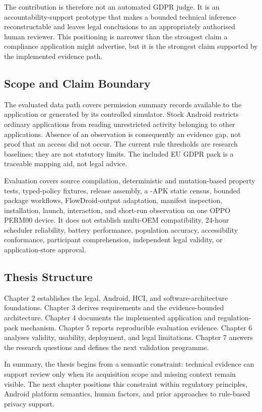 The contribution is therefore not an automated GDPR judge. It is an accountability-support prototype that makes a bounded technical inference reconstructable and leaves legal conclusions to an appropriately authorised human reviewer. This positioning is narrower than the strongest claim a compliance application might advertise, but it is the strongest claim supported by the implemented evidence path.

\subsection{Scope and Claim Boundary}

The evaluated data path covers permission summary records available to the application or generated by its controlled simulator. Stock Android restricts ordinary applications from reading unrestricted activity belonging to other applications. Absence of an observation is consequently an evidence gap, not proof that an access did not occur. The current rule thresholds are research baselines; they are not statutory limits. The included EU GDPR pack is a traceable mapping aid, not legal advice.

Evaluation covers source compilation, deterministic and mutation-based property tests, typed-policy fixtures, release assembly, a \FDroidCensusN{}-APK static census, \DevicePackagesN{} bounded package workflows, FlowDroid-output adaptation, manifest inspection, installation, launch, interaction, and short-run observation on one OPPO PERM00 device. It does not establish multi-OEM compatibility, 24-hour scheduler reliability, battery performance, population accuracy, accessibility conformance, participant comprehension, independent legal validity, or application-store approval.

\subsection{Thesis Structure}

Chapter 2 establishes the legal, Android, HCI, and software-architecture foundations. Chapter 3 derives requirements and the evidence-bounded architecture. Chapter 4 documents the implemented application and regulation-pack mechanism. Chapter 5 reports reproducible evaluation evidence. Chapter 6 analyses validity, usability, deployment, and legal limitations. Chapter 7 answers the research questions and defines the next validation programme.

In summary, the thesis begins from a semantic constraint: technical evidence can support review only when its acquisition scope and missing context remain visible. The next chapter positions this constraint within regulatory principles, Android platform semantics, human factors, and prior approaches to rule-based privacy support.

